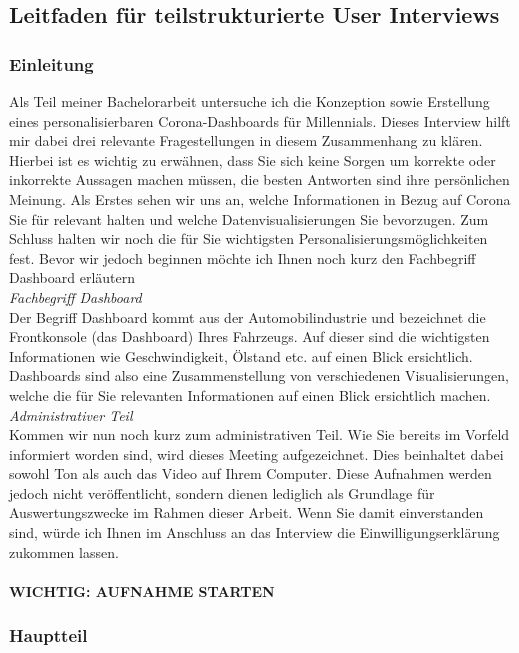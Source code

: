 \documentclass[12pt, oneside]{article}
\begin{document}
\clearpage
\subsection*{Leitfaden für teilstrukturierte User Interviews}

\subsubsection*{Einleitung}
Als Teil meiner Bachelorarbeit untersuche ich die Konzeption sowie Erstellung eines personalisierbaren Corona-Dashboards für Millennials. Dieses Interview hilft mir dabei drei relevante Fragestellungen in diesem Zusammenhang zu klären. Hierbei ist es wichtig zu erwähnen, dass Sie sich keine Sorgen um korrekte oder inkorrekte Aussagen machen müssen, die besten Antworten sind ihre persönlichen Meinung. Als Erstes sehen wir uns an, welche Informationen in Bezug auf Corona Sie für relevant halten und welche Datenvisualisierungen Sie bevorzugen. Zum Schluss halten wir noch die für Sie wichtigsten Personalisierungsmöglichkeiten fest. Bevor wir jedoch beginnen möchte ich Ihnen noch kurz den Fachbegriff Dashboard erläutern
\\

\textit{Fachbegriff Dashboard}
\\
Der Begriff Dashboard kommt aus der Automobilindustrie und bezeichnet die Frontkonsole (das Dashboard) Ihres Fahrzeugs. Auf dieser sind die wichtigsten Informationen wie Geschwindigkeit, Ölstand etc. auf einen Blick ersichtlich. Dashboards sind also eine Zusammenstellung von verschiedenen Visualisierungen, welche die für Sie relevanten Informationen auf einen Blick ersichtlich machen.\\


\textit{Administrativer Teil}
\\
Kommen wir nun noch kurz zum administrativen Teil. Wie Sie bereits im Vorfeld informiert worden sind, wird dieses Meeting aufgezeichnet. Dies beinhaltet dabei sowohl Ton als auch das Video auf Ihrem Computer. Diese Aufnahmen werden jedoch nicht veröffentlicht, sondern dienen lediglich als Grundlage für Auswertungszwecke im Rahmen dieser Arbeit. Wenn Sie damit einverstanden sind, würde ich Ihnen im Anschluss an das Interview die Einwilligungserklärung zukommen lassen.\\\\
\textbf{WICHTIG: AUFNAHME STARTEN}


\clearpage
\subsubsection*{Hauptteil}
\end{document}
